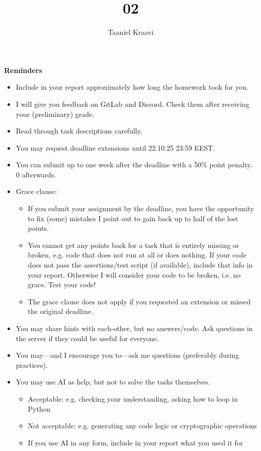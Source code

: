 \documentclass{homework}
\title{02}
\author{Taaniel Kraavi}
\date{\DTMdate{2025-10-25}}
\begin{document}
\maketitle

\textbf{Reminders}

\begin{itemize}
  \item Include in your report approximately how long the homework took for you.
  \item I will give you feedback on GitLab and Discord.
  Check them after receiving your (preliminary) grade.
  \item Read through task descriptions carefully.
  \item You may request deadline extensions until 22.10.25 23:59 EEST.
  \item You can submit up to one week after the deadline with a 50\% point penalty.
  0 afterwards.
  \item Grace clause:
  \begin{itemize}
    \item If you submit your assignment by the deadline, you have the opportunity to fix (some) mistakes I point out to gain back up to half of the lost points.
    \item You cannot get any points back for a task that is entirely missing or broken, e.g. code that does not run at all or does nothing.
    If your code does not pass the assertions/test script (if available), include that info in your report.
    Otherwise I will consider your code to be broken, i.e. no grace.
    Test your code!
    \item The grace clause does not apply if you requested an extension or missed the original deadline.
  \end{itemize}
  \item You may share hints with each-other, but no answers/code.
  Ask questions in the server if they could be useful for everyone.
  \item You may---and I encourage you to---ask me questions (preferably during practices).
  \item You may use AI as help, but not to solve the tasks themselves.
  \begin{itemize}
    \item Acceptable: e.g. checking your understanding, asking how to loop in Python
    \item Not acceptable: e.g. generating any code logic or cryptographic operations
    \item If you use AI in any form, include in your report what you used it for

\end{itemize}
\end{itemize}
\end{document}

